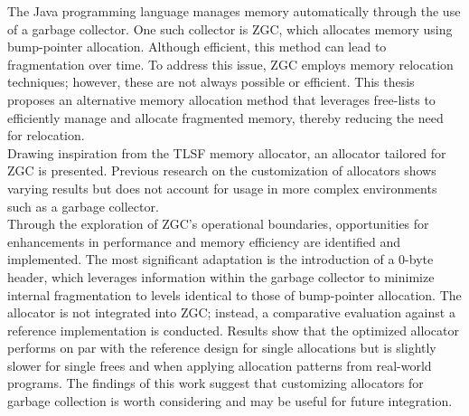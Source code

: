 
The Java programming language manages memory automatically through the use of a garbage collector. One such collector is ZGC, which allocates memory using bump-pointer allocation. Although efficient, this method can lead to fragmentation over time. To address this issue, ZGC employs memory relocation techniques; however, these are not always possible or efficient. This thesis proposes an alternative memory allocation method that leverages free-lists to efficiently manage and allocate fragmented memory, thereby reducing the need for relocation.\\

Drawing inspiration from the TLSF memory allocator, an allocator tailored for ZGC is presented. Previous research on the customization of allocators shows varying results but does not account for usage in more complex environments such as a garbage collector.\\

Through the exploration of ZGC's operational boundaries, opportunities for enhancements in performance and memory efficiency are identified and implemented. The most significant adaptation is the introduction of a 0-byte header, which leverages information within the garbage collector to minimize internal fragmentation to levels identical to those of bump-pointer allocation. The allocator is not integrated into ZGC; instead, a comparative evaluation against a reference implementation is conducted. Results show that the optimized allocator performs on par with the reference design for single allocations but is slightly slower for single frees and when applying allocation patterns from real-world programs. The findings of this work suggest that customizing allocators for garbage collection is worth considering and may be useful for future integration.\\

